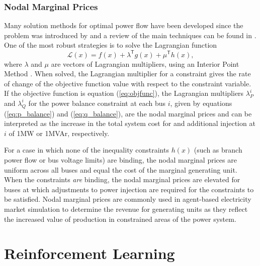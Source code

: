 \subsubsection{Nodal Marginal Prices}
Many solution methods for optimal power flow have been developed since the
problem was introduced by  and a review of the main
techniques can be found in . One of the most
robust strategies is to solve the Lagrangian function
\begin{equation}
\mathcal{L}(x) = f(x) + \lambda^\mathsf{T}g(x) + \mu^\mathsf{T}h(x),
\end{equation}
where $\lambda$ and $\mu$ are vectors of Lagrangian multipliers, using an
Interior Point Method \cite{cvxopt:2004}.  When solved, the Lagrangian
multiplier for a constraint gives the rate of change of the objective function value with respect to the
constraint variable.  If the objective function is equation (\ref{eq:objfunc}), the Lagrangian
multipliers $\lambda^i_P$ and $\lambda^i_Q$ for the power balance constraint at
each bus $i$, given by equations (\ref{eq:p_balance}) and (\ref{eq:q_balance}),
are the nodal marginal prices and can be interpreted as the increase in the
total system cost for and additional injection at $i$ of 1MW or 1MVAr,
respectively.

For a case in which none of the inequality constraints $h(x)$
(such as branch power flow or bus voltage limits) are binding, the nodal
marginal prices are uniform across all buses and equal the cost of the
marginal generating unit.  When the constraints \textit{are} binding, the nodal
marginal prices are elevated for buses at which adjustments to power injection
are required for the constraints to be satisfied.  Nodal marginal prices are
commonly used in agent-based electricity market simulation to determine the
revenue for generating units as they reflect the increased value of production in
constrained areas of the power system.

\newpage
\section{Reinforcement Learning}
\label{sec:rl}

